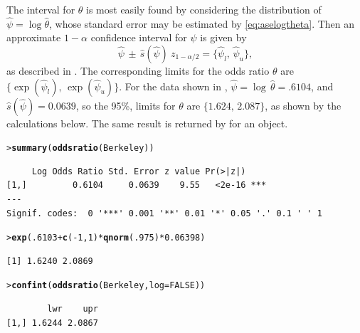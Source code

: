\documentclass[10pt,krantz2]{krantz}\usepackage[]{graphicx}\usepackage[]{color}
\makeatletter
\newcommand{\hlnum}[1]{\textcolor[rgb]{0.686,0.059,0.569}{#1}}%
\newcommand{\hlopt}[1]{\textcolor[rgb]{0,0,0}{#1}}%
\newcommand{\hlstd}[1]{\textcolor[rgb]{0.345,0.345,0.345}{#1}}%
\newcommand{\hlkwc}[1]{\textcolor[rgb]{0.333,0.667,0.333}{#1}}%
\newcommand{\hlkwd}[1]{\textcolor[rgb]{0.737,0.353,0.396}{\textbf{#1}}}%
\newenvironment{kframe}{%
 \def\at@end@of@kframe{}%
 \ifinner\ifhmode%
  \def\at@end@of@kframe{\end{minipage}}%
  \begin{minipage}{\columnwidth}%
 \fi\fi%
 \def\FrameCommand##1{\hskip\@totalleftmargin \hskip-\fboxsep
 \colorbox{shadecolor}{##1}\hskip-\fboxsep
     \hskip-\linewidth \hskip-\@totalleftmargin \hskip\columnwidth}%
 \MakeFramed {\advance\hsize-\width
   \@totalleftmargin\z@ \linewidth\hsize
   \@setminipage}}%
 {\par\unskip\endMakeFramed%
 \at@end@of@kframe}
\newenvironment{knitrout}{}{} %
\renewenvironment{knitrout}{\small\renewcommand{\baselinestretch}{.85}}{} %
\makeatother
\begin{document}
The interval for \(\theta\) is most easily found by considering the
distribution of \(\hat{\psi}  =  \log  \hat{\theta} \), whose standard
error may be estimated by \eqref{eq:aselogtheta}.  Then an approximate \(1  -  \alpha\) confidence
interval for \(\psi\) is given by
\begin{equation*}
 \hat{\psi} \,\pm\,  \hat{s} ( \hat{\psi} )  \:
z_{ 1 - \alpha  / 2 } =  \{ \hat{\psi}_l , \,  \hat{\psi}_u \}
 \comma
\end{equation*}
as described in .
The
corresponding limits for the odds ratio \(\theta\) are
\(\{ \exp ( \hat{\psi}_l ) , \,  \exp ( \hat{\psi}_u ) \}\).  For the data
shown in ,
\(\hat{\psi}  =  \log \,  \hat{\theta} =  .6104\),
and \(\hat{s}  ( \hat{\psi} )  =  0.0639\), so the 95\%,
limits for \(\theta\) are \(\{ 1.624, \,  2.087 \}\),
as shown by the calculations below. The same result is returned by  for an
 object.
\begin{knitrout}
\color{fgcolor}\begin{kframe}
\begin{alltt}
\hlstd{> }\hlkwd{summary}\hlstd{(}\hlkwd{oddsratio}\hlstd{(Berkeley))}
\end{alltt}
\begin{verbatim}
     Log Odds Ratio Std. Error z value Pr(>|z|)    
[1,]         0.6104     0.0639    9.55   <2e-16 ***
---
Signif. codes:  0 '***' 0.001 '**' 0.01 '*' 0.05 '.' 0.1 ' ' 1
\end{verbatim}
\begin{alltt}
\hlstd{> }\hlkwd{exp}\hlstd{(}\hlnum{.6103} \hlopt{+} \hlkwd{c}\hlstd{(}\hlopt{-}\hlnum{1}\hlstd{,} \hlnum{1}\hlstd{)} \hlopt{*} \hlkwd{qnorm}\hlstd{(}\hlnum{.975}\hlstd{)} \hlopt{*} \hlnum{0.06398}\hlstd{)}
\end{alltt}
\begin{verbatim}
[1] 1.6240 2.0869
\end{verbatim}
\begin{alltt}
\hlstd{> }\hlkwd{confint}\hlstd{(}\hlkwd{oddsratio}\hlstd{(Berkeley,} \hlkwc{log} \hlstd{=} \hlnum{FALSE}\hlstd{))}
\end{alltt}
\begin{verbatim}
        lwr    upr
[1,] 1.6244 2.0867
\end{verbatim}
\end{kframe}
\end{knitrout}
\end{document}
